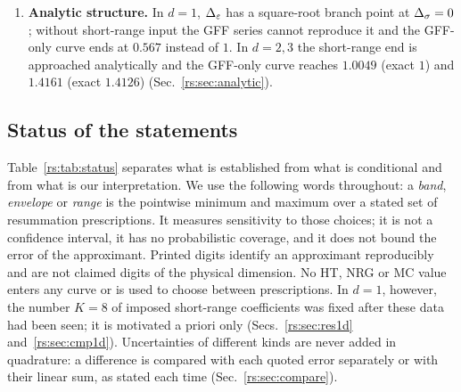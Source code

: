 \begin{enumerate}
$-\Ae$ with $\Ae=9\pi^2/\Gamma(\frac14)^4$, $\frac98$ and
$\frac94[\Gamma(\frac94)/\Gamma(\frac34)]^2$ for $d=1,2,3$. In $d=1$ the regular
one-instanton sector predicts $C_n\sim K_I(-1/\Ae)^n\Gamma(n+4)$ with
$K_I=\sci{6.2466}{-3}$; the coefficients have the predicted sign, but at $n=8$ they are
only $0.158$ of this leading form and still rising (Sec.~\ref{rs:sec:largeorder}).
\item \textbf{Analytic structure.} In $d=1$, $\Delta_\varepsilon$ has a square-root branch point at
$\Delta_\sigma=0$; without short-range input the GFF series cannot reproduce it and the GFF-only
curve ends at $0.567$ instead of $1$. In $d=2,3$ the short-range end is approached
analytically and the GFF-only curve reaches $1.0049$ (exact $1$) and $1.4161$ (exact
$1.4126$) (Sec.~\ref{rs:sec:analytic}).
\end{enumerate}

\subsection{Status of the statements}\label{rs:sec:status}
Table~\ref{rs:tab:status} separates what is established from what is conditional and from
what is our interpretation. We use the following words throughout: a \emph{band},
\emph{envelope} or \emph{range} is the pointwise minimum and maximum over a stated set of
resummation prescriptions. It measures sensitivity to those choices; it is not a
confidence interval, it has no probabilistic coverage, and it does not bound the
error of the approximant. Printed digits identify an approximant reproducibly and are
not claimed digits of the physical dimension. No HT, NRG or MC value enters any curve
or is used to choose between prescriptions. In $d=1$, however, the number $K=8$ of imposed
short-range coefficients was fixed after these data had been seen; it is motivated a priori
only (Secs.~\ref{rs:sec:res1d} and~\ref{rs:sec:cmp1d}). Uncertainties of different kinds are never
added in quadrature: a difference is compared with each quoted error separately or with
their linear sum, as stated each time (Sec.~\ref{rs:sec:compare}).

